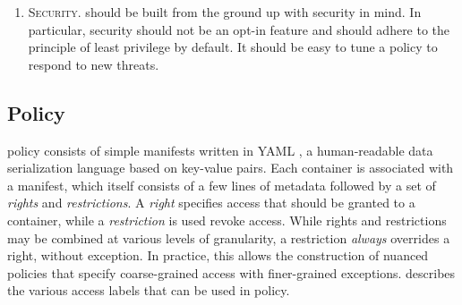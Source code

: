 \begin{enumerate}[label=\bfseries D\arabic*., ref=D\arabic*, labelindent=1em]
  \item \label{d:5} \textsc{Security.}
    \bpfcontain{} should be built from the ground up with security in mind. In
    particular, security should not be an opt-in feature and \bpfcontain{} should
    adhere to the principle of least privilege \cite{saltzer1975_protection} by
    default. It should be easy to tune a \bpfcontain{} policy to respond to new
    threats.
\end{enumerate}

\subsection{\bpfcontain{} Policy}
\label{sec:policy}

\bpfcontain{} policy consists of simple manifests written in YAML \cite{yaml},
a human-readable data serialization language based on key-value pairs.  Each
\bpfcontain{} container is associated with a manifest, which itself consists of
a few lines of metadata followed by a set of \textit{rights} and
\textit{restrictions}.  A \textit{right} specifies access that should be granted
to a container, while a \textit{restriction} is used revoke access. While rights
and restrictions may be combined at various levels of granularity, a restriction
\textit{always} overrides a right, without exception. In practice, this allows
the construction of nuanced policies that specify coarse-grained access with
finer-grained exceptions.   describes the various access
labels that can be used in \bpfcontain{} policy.

